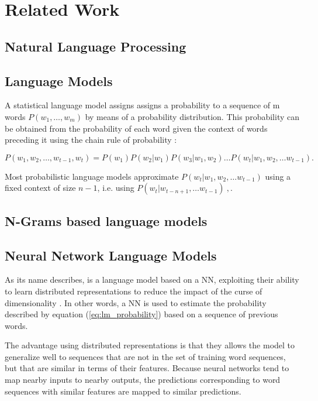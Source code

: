   
\chapter{Related Work}
\label{chap:related_work}

\section{Natural Language Processing}
\label{sec:rel_nlp}

\section{Language Models}
\label{sec:relwork-language-models}

A statistical language model assigns assigns a probability to a sequence of m
words $P(w_1,\ldots,w_m)$ by means of a probability distribution. 
This probability can be obtained from the probability of
each word given the context of words preceding it using the chain rule of probability \cite{Bengio:2008}:

\begin{equation}
\label{eq:lm_probability}
 P(w_1, w_2, \ldots, w_{t-1},w_t) = P(w_1) P(w_2|w_1) P(w_3|w_1,w_2) \ldots 
  P(w_t | w_1, w_2, \ldots w_{t-1}).
\end{equation}

Most probabilistic language models  approximate $P(w_t | w_1, w_2, \ldots
w_{t-1})$ using a fixed context of size $n-1$, i.e. using  $P(w_t | w_{t-n+1}, \ldots w_{t-1})\ ,$.



\section{N-Grams based language models}
\label{sec:n-gram-lm}

\section{Neural Network Language Models}
\label{sec:nnlms-intro}

As its name describes, is a language model based on a \ac{NN}, exploiting their
ability to learn distributed representations to reduce the impact of the
curse of dimensionality \cite{Bengio:2008}. In other words, a \ac{NN} is
used to estimate the probability described  by equation (\ref{eq:lm_probability}) based on a sequence of
previous words.

The advantage  using  distributed representations  is that they allows
the model to generalize well to sequences that are not in the set of training
word sequences, but that are similar in terms of their features. Because neural networks tend to map nearby inputs
to nearby outputs, the predictions corresponding to word sequences with
similar features are mapped to similar predictions. \cite{Bengio:2008,Bengio:2003:NPL:944919.944966}


